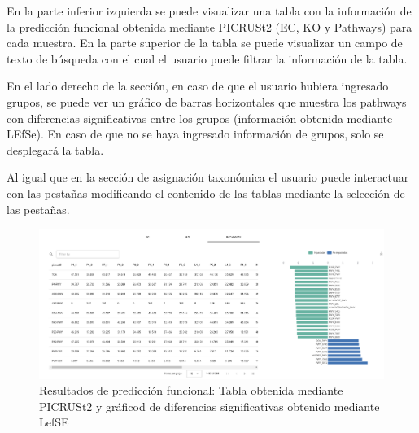 En la parte inferior izquierda se puede visualizar una tabla con la información de la predicción funcional obtenida mediante PICRUSt2 (EC, KO y Pathways) para cada muestra. 
En la parte superior de la tabla se puede visualizar un campo de texto de búsqueda con el cual el usuario puede filtrar la información de la tabla.

En el lado derecho de la sección, en caso de que el usuario hubiera ingresado grupos, se puede ver un gráfico de barras horizontales que muestra los pathways con diferencias significativas entre los grupos (información obtenida mediante LEfSe). 
En caso de que no se haya ingresado información de grupos, solo se desplegará la tabla.

Al igual que en la sección de asignación taxonómica el usuario puede interactuar con las pestañas modificando el contenido de las tablas mediante la selección de las pestañas.


\begin{figure}[H]
    \includegraphics[width=1\linewidth]{images/app/results/functinoal_pred.png}

    \caption{Resultados de predicción funcional: Tabla obtenida mediante PICRUSt2 y gráficod de diferencias significativas obtenido mediante LefSE}
    \label{fig:app-results-functional-pred}
\end{figure}
